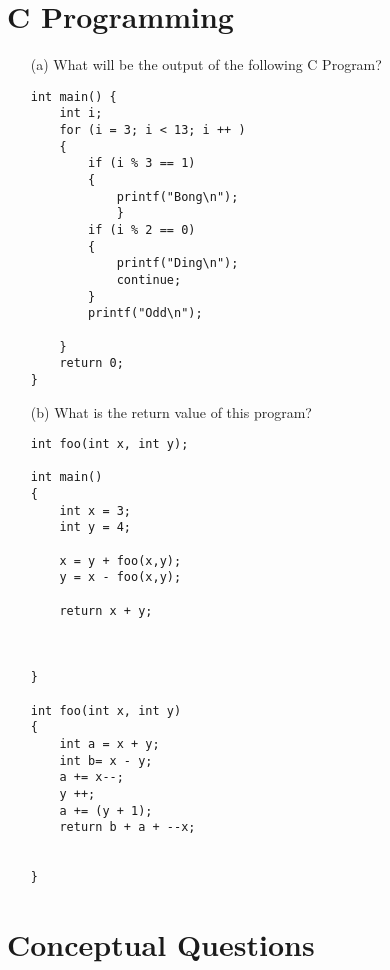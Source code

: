 \documentclass{article}
\begin{document}
\section{C Programming}
\begin{enumerate}
    \item[(a)] What will be the output of the following C Program?
    \begin{lstlisting}[style=CStyle]
int main() {
	int i;
	for (i = 3; i < 13; i ++ )
	{
		if (i % 3 == 1)
		{
			printf("Bong\n");	  		
            }
		if (i % 2 == 0)
		{
			printf("Ding\n");
			continue;
		}
		printf("Odd\n");
		
	}
	return 0;
}
    \end{lstlisting}
    \item[(b)] What is the return value of this program?
    \begin{lstlisting}[style=CStyle]
int foo(int x, int y);

int main()
{
	int x = 3;
	int y = 4;

	x = y + foo(x,y); 
	y = x - foo(x,y); 
			
	return x + y;



}

int foo(int x, int y)
{
	int a = x + y;
	int b= x - y;
	a += x--;
	y ++;
	a += (y + 1);
	return b + a + --x;


}

    \end{lstlisting}
    

\end{enumerate}
\section{Conceptual Questions}
\end{document}
